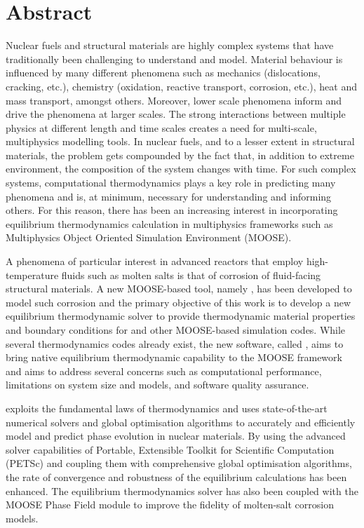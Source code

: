 \chapter*{Abstract}

Nuclear fuels and structural materials are highly complex systems that have traditionally been challenging to understand and model. Material behaviour is influenced by many different phenomena such as mechanics (dislocations, cracking, etc.), chemistry (oxidation, reactive transport, corrosion, etc.), heat and mass transport, amongst  others. Moreover, lower scale phenomena inform and drive the phenomena at larger scales. The strong interactions between multiple physics at different length and time scales creates a need for multi-scale, multiphysics modelling tools. In nuclear fuels, and to a lesser extent in structural materials, the problem gets compounded by the fact that, in addition to extreme environment, the composition of the system changes with time. For such complex systems, computational thermodynamics plays a key role in predicting many phenomena and is, at minimum, necessary for understanding and informing others. For this reason, there has been an increasing interest in incorporating equilibrium thermodynamics calculation in multiphysics frameworks such as Multiphysics Object Oriented Simulation Environment (MOOSE).


A phenomena of particular interest in advanced reactors that employ high-temperature fluids such as molten salts is that of corrosion of fluid-facing structural materials. A new MOOSE-based tool, namely {\YJ}, has been developed to model such corrosion and the primary objective of this work is to develop a new equilibrium thermodynamic solver to provide thermodynamic material properties and boundary conditions for {\YJ} and other MOOSE-based simulation codes. While several thermodynamics codes already exist, the new software, called {\GEM}, aims to bring native equilibrium thermodynamic capability to the MOOSE framework and aims to address several concerns such as computational performance, limitations on system size and models, and software quality assurance.

{\GEM} exploits the fundamental laws of thermodynamics and uses state-of-the-art numerical solvers and global optimisation algorithms to accurately and efficiently model and predict phase evolution in nuclear materials. By using the advanced solver capabilities of Portable, Extensible Toolkit for Scientific Computation (PETSc) and coupling them with comprehensive global optimisation algorithms, the rate of convergence and robustness of the equilibrium calculations has been enhanced. The equilibrium thermodynamics solver has also been coupled with the MOOSE Phase Field module to improve the fidelity of molten-salt corrosion models.


